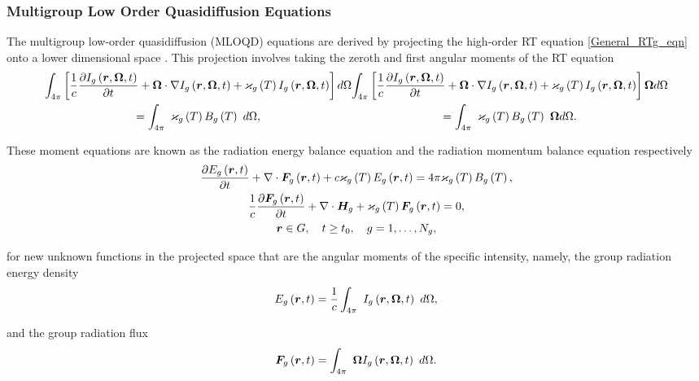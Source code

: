 \subsubsection{Multigroup Low Order Quasidiffusion Equations}
	The multigroup low-order quasidiffusion (MLOQD) equations are derived by projecting the high-order RT equation \eqref{General_RTg_eqn} onto a lower dimensional space \cite{gol'din-1964,Goldin-sbornik-82,PASE-1986,dya-aristova-vya-mm1996,aristova-vya-avk-m&c1999}. This projection involves taking the zeroth and first angular moments of the RT equation
	\begin{subequations}
		\begin{multline}
		\angintb{\frac{1}{c}\dt{\ig\gendepg} + \bOm\cdot\grad\ig\gendepg + \kapg\pr{T}\ig\gendepg} \\= \angint{\kapg\pr{T}\Bg\pr{T}},
		\end{multline}
		\vspace*{-1cm}
		\begin{multline}
		\anginttb{\frac{1}{c}\dt{\ig\gendepg} + \bOm\cdot\grad\ig\gendepg + \kapg\pr{T}\ig\gendepg} \\= \angintt{\kapg\pr{T}\Bg\pr{T}}.
		\end{multline}
	\end{subequations}
	
	These moment equations are known as the radiation energy balance equation and the radiation momentum balance equation respectively \cite{olson-auer-hall-2000}
	\begin{subequations}
		\begin{gather}
			\frac{\partial E_g\left(\bm{r},t\right)}{\partial t} + \nabla\cdot\bm{F}_g\left(\bm{r},t\right) + c\varkappa_{g}\left( T\right)E_g\left(\bm{r},t\right) = 4\pi\varkappa_{g}\left( T\right)B_{g}\left( T\right), \label{zero_amom} \\
			\frac{1}{c}\frac{\partial \bm{F}_g\left(\bm{r},t\right)}{\partial t} + \nabla\cdot\bm{H}_g + \varkappa_{g}\left( T\right)\bm{F}_g\left(\bm{r},t\right) = 0, \label{first_amom}\\
			\bm{r} \in G, \quad t\geq t_0, \quad g=1,\dots,N_g, \nonumber
		\end{gather}
	\end{subequations}
	
	for new unknown functions in the projected space that are the angular moments of the specific intensity, namely, the group radiation energy density
	\begin{equation}
		E_g\left(\bm{r},t\right) = \frac{1}{c}\int_{4\pi} \ I_{g}\left(\bm{r},\bm{\Omega},t\right) \ d\Omega, \label{egdef}
	\end{equation}
	
	and the group radiation flux
	\begin{equation}
		\bm{F}_g\left(\bm{r},t\right) = \int_{4\pi} \ \bm{\Omega}I_{g}\left(\bm{r},\bm{\Omega},t\right) \ d\Omega.
	\end{equation}
	
